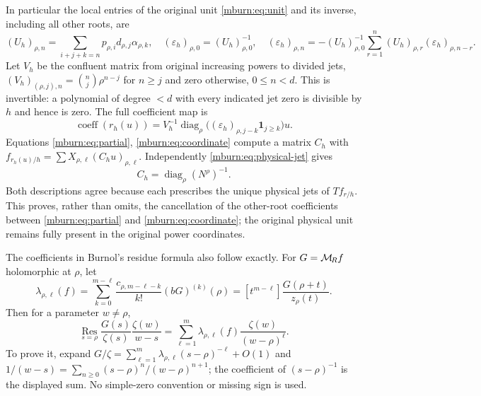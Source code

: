 \documentclass[11pt]{article}
\begin{document}
In particular the local entries of the original unit
\eqref{mburn:eq:unit} and its inverse, including all other roots, are
\begin{equation}\label{mburn:eq:fullunit}
 (U_h)_{\rho,n}=\sum_{i+j+k=n}p_{\rho,i}d_{\rho,j}\alpha_{\rho,k},
 \quad(\varepsilon_h)_{\rho,0}=(U_h)_{\rho,0}^{-1},\quad
 (\varepsilon_h)_{\rho,n}=-(U_h)_{\rho,0}^{-1}
       \sum_{r=1}^n(U_h)_{\rho,r}(\varepsilon_h)_{\rho,n-r}.
\end{equation}
Let $V_h$ be the confluent matrix from original increasing powers
to divided jets, $(V_h)_{(\rho,j),n}=\binom nj\rho^{n-j}$ for
$n\geq j$ and zero otherwise, $0\leq n<d$. This is invertible:
a polynomial of degree $<d$ with every indicated jet zero is
divisible by $h$ and hence is zero. The full coefficient map is
\begin{equation}\label{mburn:eq:coordinate}
 \operatorname{coeff}(r_h(u))=
 V_h^{-1}\operatorname{diag}_{\rho}
       \bigl((\varepsilon_h)_{\rho,j-k}\mathbf1_{j\geq k}\bigr)u.
\end{equation}
Equations \eqref{mburn:eq:partial}, \eqref{mburn:eq:coordinate} compute a
matrix $C_h$ with $f_{r_h(u)/h}=\sum X_{\rho,\ell}(C_hu)_{\rho,\ell}$.
Independently \eqref{mburn:eq:physical-jet} gives
\begin{equation}\label{mburn:eq:Ch}
 C_h=\operatorname{diag}_{\rho}(N^\rho)^{-1}.
\end{equation}
Both descriptions agree because each prescribes the unique
physical jets of $T f_{r/h}$. This proves, rather than omits,
the cancellation of the other-root coefficients between
\eqref{mburn:eq:partial} and \eqref{mburn:eq:coordinate}; the original
physical unit remains fully present in the original power coordinates.

The coefficients in Burnol's residue formula also follow exactly.
For $G=\mathcal M_{\!R} f$ holomorphic at $\rho$, let
\begin{equation}\label{mburn:eq:residue-coeff}
 \lambda_{\rho,\ell}(f)=
 \sum_{k=0}^{m-\ell}\frac{c_{\rho,m-\ell-k}}{k!}
                 (bG)^{(k)}(\rho)
 = [t^{m-\ell}]\frac{G(\rho+t)}{z_\rho(t)}.
\end{equation}
Then for a parameter $w\ne\rho$,
\begin{equation}\label{mburn:eq:residue}
 \operatorname*{Res}_{s=\rho}
   \frac{G(s)}{\zeta(s)}\frac{\zeta(w)}{w-s}
   =\sum_{\ell=1}^m\lambda_{\rho,\ell}(f)
                                    \frac{\zeta(w)}{(w-\rho)^\ell}.
\end{equation}
To prove it, expand $G/\zeta=\sum_{\ell=1}^m
\lambda_{\rho,\ell}(s-\rho)^{-\ell}+O(1)$ and
$1/(w-s)=\sum_{n\geq0}(s-\rho)^n/(w-\rho)^{n+1}$;
the coefficient of $(s-\rho)^{-1}$ is the displayed sum.
No simple-zero convention or missing sign is used.
\end{document}
